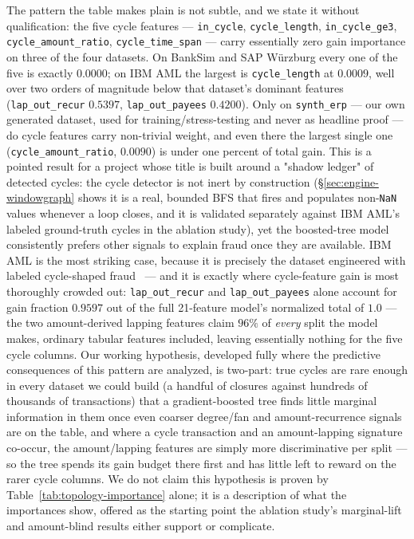 The pattern the table makes plain is not subtle, and we state it without
qualification: the five cycle features — \texttt{in\_cycle},
\texttt{cycle\_length}, \texttt{in\_cycle\_ge3}, \texttt{cycle\_amount\_ratio},
\texttt{cycle\_time\_span} — carry essentially zero gain importance on three
of the four datasets. On BankSim and SAP Würzburg every one of the five is
exactly $0.0000$; on IBM AML the largest is \texttt{cycle\_length} at
$0.0009$, well over two orders of magnitude below that dataset's dominant features
(\texttt{lap\_out\_recur} $0.5397$, \texttt{lap\_out\_payees} $0.4200$). Only
on \texttt{synth\_erp} — our own generated dataset, used for
training/stress-testing and never as headline proof — do cycle features
carry non-trivial weight, and even there the largest single one
(\texttt{cycle\_amount\_ratio}, $0.0090$) is under one percent of total gain.
This is a pointed result for a project whose title is built around a
"shadow ledger" of detected cycles: the cycle detector is not inert by
construction (\S\ref{sec:engine-windowgraph} shows it is a real, bounded BFS
that fires and populates non-\texttt{NaN} values whenever a loop closes,
and it is validated separately against IBM AML's labeled ground-truth cycles
in the ablation study), yet the boosted-tree model consistently prefers
other signals to explain fraud once they are available. IBM AML is the most
striking case, because it is precisely the dataset engineered with labeled
cycle-shaped fraud~\cite{altman2023realistic} — and it is exactly where
cycle-feature gain is most thoroughly crowded out: \texttt{lap\_out\_recur}
and \texttt{lap\_out\_payees} alone account for gain fraction $0.9597$ out of
the full 21-feature model's normalized total of $1.0$ — the two amount-derived
lapping features claim $96\%$ of \emph{every} split the model makes, ordinary
tabular features included, leaving essentially nothing for the five cycle
columns.
Our working hypothesis, developed fully where the predictive consequences of
this pattern are analyzed, is two-part: true cycles are rare enough in every
dataset we could build (a handful of closures against hundreds of thousands
of transactions) that a gradient-boosted tree finds little marginal
information in them once even coarser degree/fan and amount-recurrence
signals are on the table, and where a cycle transaction and an
amount-lapping signature co-occur, the amount/lapping features are simply
more discriminative per split — so the tree spends its gain budget there
first and has little left to reward on the rarer cycle columns. We do not
claim this hypothesis is proven by Table~\ref{tab:topology-importance} alone;
it is a description of what the importances show, offered as the
starting point the ablation study's marginal-lift and amount-blind results
either support or complicate.
